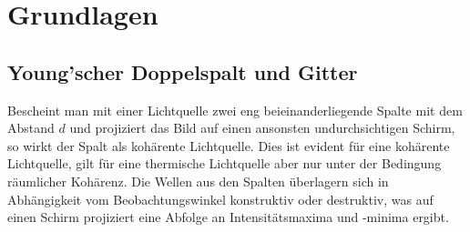 \documentclass[ngerman]{scrartcl}
\begin{document}
\section[Grundlagen]{Grundlagen \cite{ref:angabe}}
\label{sec:grundlagen}

\subsection{Young'scher Doppelspalt und Gitter}
\label{sec:grundlagen_youngscher_doppelspalt_gitter}

Bescheint man mit einer Lichtquelle zwei eng beieinanderliegende Spalte mit dem Abstand $d$ und projiziert das Bild auf einen ansonsten undurchsichtigen Schirm, so wirkt der Spalt als kohärente Lichtquelle. Dies ist evident für eine kohärente Lichtquelle, gilt für eine thermische Lichtquelle aber nur unter der Bedingung räumlicher Kohärenz. Die Wellen aus den Spalten überlagern sich in Abhängigkeit vom Beobachtungswinkel konstruktiv oder destruktiv, was auf einen Schirm projiziert eine Abfolge an Intensitätsmaxima und -minima ergibt.
\end{document}
